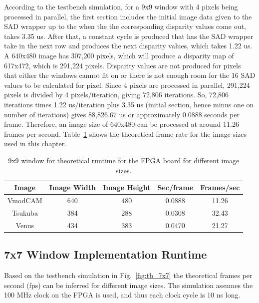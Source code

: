 According to the testbench simulation, for a 9x9 window with 4 pixels being processed in parallel, the first section includes the initial image data given to the SAD wrapper up to the when the the corresponding disparity values come out, takes 3.35 us. After that, a constant cycle is produced that has the SAD wrapper take in the next row and produces the next disparity values, which takes 1.22 us. A 640x480 image has 307,200 pixels, which will produce a disparity map of 617x472, which is 291,224 pixels. Disparity values are not produced for pixels that either the windows cannot fit on or there is not enough room for the 16 SAD values to be calculated for pixel. Since 4 pixels are processed in parallel, 291,224 pixels is divided by 4 pixels/iteration, giving 72,806 iterations. So, 72,806 iterations times 1.22 us/iteration plus 3.35 us (initial section, hence minus one on number of iterations) gives 88,826.67 us or approximately 0.0888 seconds per frame. Therefore, an image size of 640x480 can be processed at around 11.26 frames per second. Table~\ref{table:tb_9x9} shows the theoretical frame rate for the image sizes used in this chapter.

\begin{table}
	\begin{center}
		\begin{tabular}{|c|c|c|c|c|}
			\hline 
				\rowstyle{\bfseries} Image & 
				\rowstyle{\bfseries} Image Width & 
				\rowstyle{\bfseries} Image Height & 
				\rowstyle{\bfseries} Sec/frame & 
				\rowstyle{\bfseries} Frames/sec
			\tabularnewline
			\hline 
			VmodCAM & 640 & 480 & 0.0888 & 11.26
			\tabularnewline
			\hline 
			Tsukuba & 384 & 288 & 0.0308 & 32.43
			\tabularnewline
			\hline 
			Venus & 434 & 383 & 0.0470 & 21.27
			\tabularnewline
			\hline 			
			\end{tabular}
		\captionfonts
		\caption{9x9 window for theoretical runtime for the FPGA board for different image sizes.}
		\label{table:tb_9x9}
	\end{center}
\end{table}

\subsection{7x7 Window Implementation Runtime}
\label{sec:testbench7x7}

Based on the testbench simulation in Fig.~\ref{fig:tb_7x7} the theoretical frames per second (fps) can be inferred for different image sizes. The simulation assumes the 100 MHz clock on the FPGA is used, and thus each clock cycle is 10 ns long.

